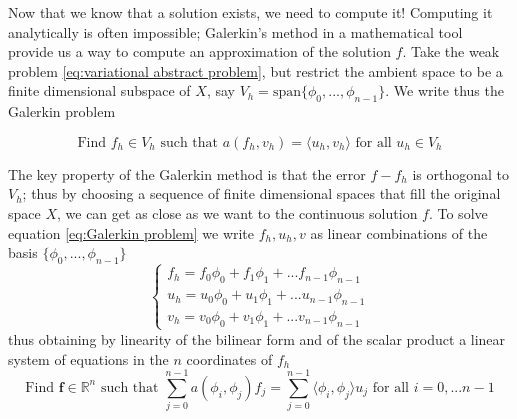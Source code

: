 Now that we know that a solution exists, we need to compute it! Computing it analytically is often impossible; Galerkin's method in a mathematical tool provide us a way to compute an approximation of the solution $f$. Take the weak problem \ref{eq:variational abstract problem}, but restrict the ambient space to be a finite dimensional subspace of $X$, say $V_h = \text{span}\{\phi_0, ..., \phi_{n-1}\}$. We write thus the Galerkin problem
\vspace{0.5cm}

\begin{equation}\label{eq:Galerkin problem}
		\text{Find }f_h\in V_h\text{ such that } a(f_h, v_h)=\langle u_h, v_h\rangle \text{ for all } u_h \in V_h
\end{equation}
\vspace{0.5cm}

The key property of the Galerkin method is that the error $f-f_h$ is orthogonal to $V_h$; thus by choosing a sequence of finite dimensional spaces that fill the original space $X$, we can get as close as we want to the continuous solution $f$.
To solve equation \ref{eq:Galerkin problem} we write $f_h, u_h, v$ as linear combinations of the basis $\{\phi_0, ..., \phi_{n-1}\}$
\begin{equation}\label{eq:basis functions}
	\begin{cases}
	f_h = f_0\phi_0 +  f_1\phi_1 + ...  f_{n-1}\phi_{n-1}\\
	u_h = u_0\phi_0 +  u_1\phi_1 + ...  u_{n-1}\phi_{n-1}\\
	v_h = v_0\phi_0 +  v_1\phi_1 + ...  v_{n-1}\phi_{n-1}
	\end{cases}
\end{equation}
 thus obtaining by linearity of the bilinear form and of the scalar product a linear system of equations in the $n$ coordinates of $f_h$
\begin{equation}\label{eq:Galerkin problem in the basis functions}
\text{Find }\mathbf f\in\mathbb R^n\text{ such that } \sum_{j=0}^{n-1}a(\phi_i, \phi_j)f_j=\sum_{j=0}^{n-1}\langle \phi_i, \phi_j\rangle u_j \text{ for all } i=0, ... n-1
\end{equation}

